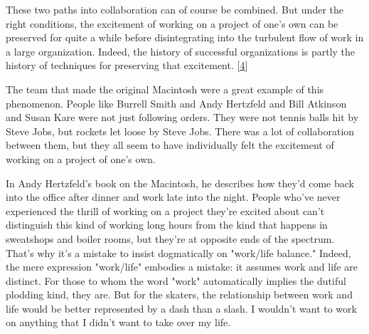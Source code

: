 These two paths into collaboration can of course
                  be combined. But under the right conditions, the excitement of
                  working on a project of one's own can be preserved for quite a
                  while before disintegrating into the turbulent flow of work in
                  a large organization. Indeed, the history of successful
                  organizations is partly the history of techniques for
                  preserving that excitement.
                  [\href{\#f4n}{4}]

The team that made the original Macintosh were a
                  great example of this phenomenon. People like Burrell Smith
                  and Andy Hertzfeld and Bill Atkinson and Susan Kare were not
                  just following orders. They were not tennis balls hit by Steve
                  Jobs, but rockets let loose by Steve Jobs. There was a lot of
                  collaboration between them, but they all seem to have
                  individually felt the excitement of working on a project of
                  one's own.

In Andy Hertzfeld's book on the
                  Macintosh, he describes how they'd come back into the office
                  after dinner and work late into the night. People who've never
                  experienced the thrill of working on a project they're excited
                  about can't distinguish this kind of working long hours from
                  the kind that happens in sweatshops and boiler rooms, but
                  they're at opposite ends of the spectrum. That's why it's a
                  mistake to insist dogmatically on "work/life balance." Indeed,
                  the mere expression "work/life" embodies a mistake: it assumes
                  work and life are distinct. For those to whom the word "work"
                  automatically implies the dutiful plodding kind, they are. But
                  for the skaters, the relationship between work and life would
                  be better represented by a dash than a slash. I wouldn't want
                  to work on anything that I didn't want to take over my
                  life.

